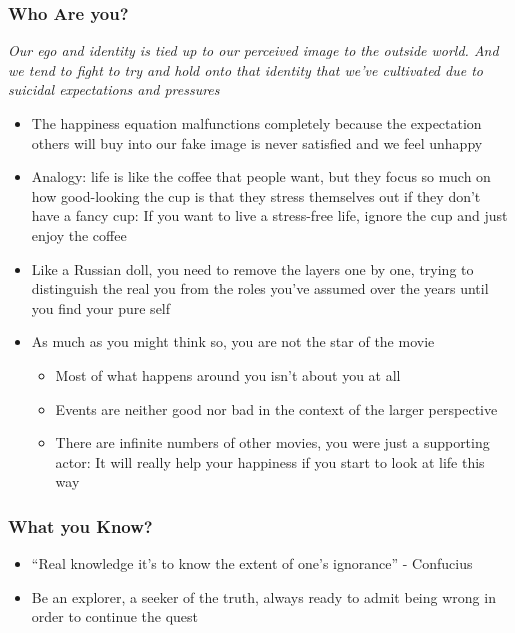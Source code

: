 \begin{frame}[fragile]\frametitle{Who Are you?}

{\em Our ego and identity is tied up to our perceived image to the outside world. And we tend to fight to try and hold onto that identity that we’ve cultivated due to suicidal expectations and pressures}

\begin{itemize}
\item The happiness equation malfunctions completely because the expectation others will buy into our fake image is never satisfied and we feel unhappy
\item Analogy: life is like the coffee that people want, but they focus so much on how good-looking the cup is that they stress themselves out if they don’t have a fancy cup: If you want to live a stress-free life, ignore the cup and just enjoy the coffee
\item Like a Russian doll, you need to remove the layers one by one, trying to distinguish the real you from the roles you’ve assumed over the years until you find your pure self
\item As much as you might think so, you are not the star of the movie
	\begin{itemize}
	\item Most of what happens around you isn’t about you at all
	\item Events are neither good nor bad in the context of the larger perspective
	\item There are infinite numbers of other movies, you were just a supporting actor: It will really help your happiness if you start to look at life this way
	\end{itemize}
\end{itemize}
\end{frame}

\begin{frame}[fragile]\frametitle{What you Know?}
\begin{itemize}
\item “Real knowledge it’s to know the extent of one’s ignorance” - Confucius
\item Be an explorer, a seeker of the truth, always ready to admit being wrong in order to continue the quest
\end{itemize}
\end{frame}

